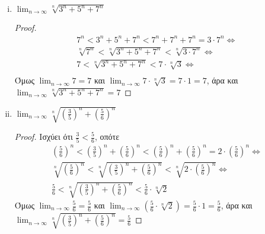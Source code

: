 \begin{enumerate}
        \begin{enumerate}[i)]
            \item $ \lim_{n \to \infty} \sqrt[n]{3^{n} + 5^{n}+7^{n}} $ 
                \begin{proof}
                    \begin{gather*}
                        7^{n} < 3^{n}+5^{n}+7^{n} < 7^{n}+7^{n}+7^{n} = 3\cdot 7^{n} 
                        \Leftrightarrow \\
                        \sqrt[n]{7^{n}} < \sqrt[n]{3^{n}+5^{n}+7^{n}} < 
                        \sqrt[n]{3 \cdot 7^{n}} \Leftrightarrow \\
                        7 < \sqrt[n]{3^{n}+5^{n}+7^{n}} < 7\cdot \sqrt[n]{3} 
                        \Leftrightarrow \\
                    \end{gather*}
                    Όμως $ \lim_{n \to \infty} 7 = 7 $ και $ \lim_{n \to \infty} 7 
                    \cdot \sqrt[n]{3} = 7 \cdot 1 = 7$, άρα και $ 
                    \lim_{n \to \infty} \sqrt[n]{3^{n}+5^{n}+7^{n}} = 7$
                \end{proof}

            \item $ \lim_{n \to \infty} \sqrt[n]{\left(\frac{3}{5}\right)^{n}+
                \left(\frac{5}{6}\right)^{n}} $
                \begin{proof}
                    Ισχύει ότι $ \frac{3}{5} < \frac{5}{6} $, οπότε
                    \begin{gather*}
                        \left(\frac{5}{6}\right)^{n} < \left(\frac{3}{5}\right)^{n}+ 
                        \left(\frac{5}{6}\right)^{n} < \left(\frac{5}{6}\right)^{n} + 
                        \left(\frac{5}{6}\right)^{n} = 2 \cdot 
                        \left(\frac{5}{6}\right)^{n} 
                        \Leftrightarrow \\
                        \sqrt[n]{\left(\frac{5}{6}\right)^{n}} < 
                        \sqrt[n]{\left(\frac{3}{5}\right)^{n}+ 
                        \left(\frac{5}{6}\right)^{n}} < 
                        \sqrt[n]{2\cdot \left(\frac{5}{6}\right)^{n}} 
                        \Leftrightarrow \\
                        \frac{5}{6} < \sqrt[n]{\left(\frac{3}{5}\right)^{n}+ 
                        \left(\frac{5}{6}\right)^{n}} < \frac{5}{6} \cdot 
                        \sqrt[n]{2} 
                    \end{gather*}
                    Όμως $ \lim_{n \to \infty} \frac{5}{6} = \frac{5}{6} $ και 
                    $ \lim_{n \to \infty} \left(\frac{5}{6} \cdot \sqrt[n]{2}\right) = 
                    \frac{5}{6} \cdot 1 = \frac{5}{6} $, άρα και $ 
                    \lim_{n \to \infty} \sqrt[n]{\left(\frac{3}{5} \right)^{n} + 
                    \left(\frac{5}{6}\right)^{n}} = \frac{5}{6} $
                \end{proof}


\end{enumerate}
\end{enumerate}
